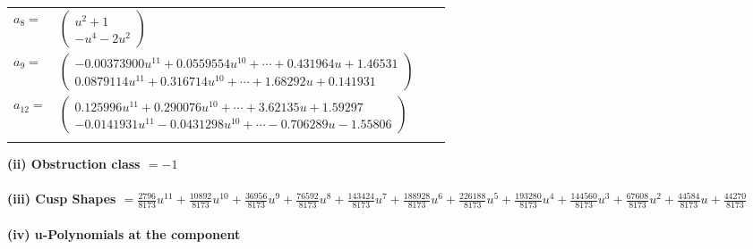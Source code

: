 \documentclass[1p]{elsarticle_modified}
\theoremstyle{definition}
\begin{document}
\begin{tabular}{m{7pt} m{180pt} m{7pt} m{180pt} }
\flushright $a_{8}=$&$\begin{pmatrix}u^2+1\\- u^4-2 u^2\end{pmatrix}$ \\
\flushright $a_{9}=$&$\begin{pmatrix}-0.00373900 u^{11}+0.0559554 u^{10}+\cdots+0.431964 u+1.46531\\0.0879114 u^{11}+0.316714 u^{10}+\cdots+1.68292 u+0.141931\end{pmatrix}$ \\
\flushright $a_{12}=$&$\begin{pmatrix}0.125996 u^{11}+0.290076 u^{10}+\cdots+3.62135 u+1.59297\\-0.0141931 u^{11}-0.0431298 u^{10}+\cdots-0.706289 u-1.55806\end{pmatrix}$\\&\end{tabular}
\flushleft \textbf{(ii) Obstruction class $= -1$}\\~\\
\flushleft \textbf{(iii) Cusp Shapes $= \frac{2796}{8173} u^{11}+\frac{10892}{8173} u^{10}+\frac{36956}{8173} u^9+\frac{76592}{8173} u^8+\frac{143424}{8173} u^7+\frac{188928}{8173} u^6+\frac{226188}{8173} u^5+\frac{193280}{8173} u^4+\frac{144560}{8173} u^3+\frac{67608}{8173} u^2+\frac{44584}{8173} u+\frac{44270}{8173}$}\\~\\
\newpage\renewcommand{\arraystretch}{1}
\flushleft \textbf{(iv) u-Polynomials at the component}\newline \\
\end{document}
